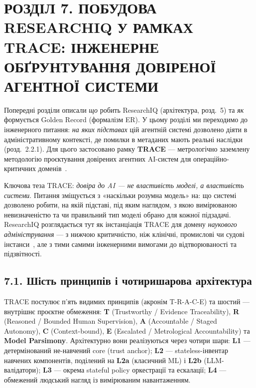 \section*{РОЗДІЛ 7. ПОБУДОВА RESEARCHIQ У РАМКАХ TRACE: ІНЖЕНЕРНЕ ОБҐРУНТУВАННЯ ДОВІРЕНОЇ АГЕНТНОЇ СИСТЕМИ}
\label{sec:trace-engineering}

Попередні розділи описали \emph{що} робить ResearchIQ (архітектура, розд.~5) та \emph{як} формується Golden Record (формалізм ER). У цьому розділі ми переходимо до інженерного питання: \emph{на яких підставах} цій агентній системі дозволено діяти в адміністративному контексті, де помилки в метаданих мають реальні наслідки (розд.~2.2.1). Для цього застосовано рамку \textbf{TRACE} --- метрологічно заземлену методологію проєктування довірених агентних AI-систем для операційно-критичних доменів~\cite{Zabolotnii2026TRACE}.

Ключова теза TRACE: \emph{довіра до AI --- не властивість моделі, а властивість системи}. Питання зміщується з «наскільки розумна модель» на: що системі дозволено робити, на якій підставі, під яким наглядом, з якою вимірюваною невизначеністю та чи правильний тип моделі обрано для кожної підзадачі. ResearchIQ розглядається тут як інстанціація TRACE для домену \emph{наукового адміністрування} --- з нижчою критичністю, ніж клінічні, промислові чи судові інстанси~\cite{Zabolotnii2026TRACE}, але з тими самими інженерними вимогами до відтворюваності та підзвітності.

\subsection*{7.1. Шість принципів і чотиришарова архітектура}

TRACE постулює п'ять видимих принципів (акронім T-R-A-C-E) та шостий --- внутрішнє проєктне обмеження: \textbf{T} (Trustworthy / Evidence Traceability), \textbf{R} (Reasoned / Bounded Human Supervision), \textbf{A} (Accountable / Staged Autonomy), \textbf{C} (Context-bound), \textbf{E} (Escalated / Metrological Accountability) та \textbf{Model Parsimony}. Архітектурно вони реалізуються через чотири шари: \textbf{L1} --- детермінований не-навчений core (trust anchor); \textbf{L2} --- stateless-інвентар навчених компонентів, поділений на \textbf{L2a} (класичний ML) і \textbf{L2b} (LLM-валідатори); \textbf{L3} --- окрема stateful policy оркестрації та ескалації; \textbf{L4} --- обмежений людський нагляд із вимірюваним навантаженням.

